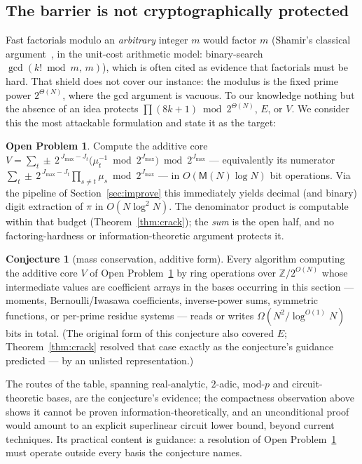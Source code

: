 \documentclass[11pt]{article}
\theoremstyle{remark}
\theoremstyle{definition}
\newtheorem{openproblem}[theorem]{Open Problem}
\newtheorem{conjecture}[theorem]{Conjecture}
\newcommand{\M}{\mathsf{M}}
\newcommand{\Z}{\mathbb{Z}}
\begin{document}
\subsection{The barrier is not cryptographically protected}

Fast factorials modulo an \emph{arbitrary} integer $m$ would factor $m$
(Shamir's classical argument~\cite{Shamir79}, in the unit-cost arithmetic model: binary-search
$\gcd(k!\bmod m,\,m)$), which is often cited as evidence that factorials
must be hard. That shield does not cover our instance: the modulus is the
fixed prime power $2^{\Theta(N)}$, where the gcd argument is vacuous. To
our knowledge nothing but the absence of an idea protects
$\prod(8k+1)\bmod 2^{\Theta(N)}$, $E$, or $V$. We consider this the most
attackable formulation and state it as the target:

\begin{openproblem}\label{op:E}
Compute the additive core
$V=\sum_t \pm\,2^{\,J_{\max}-J_t}\bigl(\mu_t^{-1}\bmod 2^{J_{\max}}\bigr)
\bmod 2^{J_{\max}}$ --- equivalently its numerator
$\sum_t \pm\,2^{\,J_{\max}-J_t}\prod_{s\ne t}\mu_s \bmod 2^{J_{\max}}$
--- in $O(\M(N)\log N)$ bit operations. Via the pipeline of
Section~\ref{sec:improve} this immediately yields decimal (and binary)
digit extraction of $\pi$ in $O(N\log^{2}N)$. The denominator product is
computable within that budget (Theorem~\ref{thm:crack}); the \emph{sum}
is the open half, and no factoring-hardness or information-theoretic
argument protects it.
\end{openproblem}

\begin{conjecture}[mass conservation, additive form]\label{conj:mass}
Every algorithm computing the additive core $V$ of
Open Problem~\ref{op:E} by ring operations over $\Z/2^{O(N)}$ whose
intermediate values are coefficient arrays in the bases occurring in
this section --- moments, Bernoulli/Iwasawa coefficients, inverse-power
sums, symmetric functions, or per-prime residue systems --- reads or
writes $\Omega(N^{2}/\log^{O(1)}N)$ bits in total. (The original form of
this conjecture also covered $E$; Theorem~\ref{thm:crack} resolved that
case exactly as the conjecture's guidance predicted --- by an
unlisted representation.)
\end{conjecture}

The routes of the table, spanning real-analytic, $2$-adic, mod-$p$ and
circuit-theoretic bases, are the conjecture's evidence; the compactness
observation above shows it cannot be proven information-theoretically,
and an unconditional proof would amount to an explicit superlinear
circuit lower bound, beyond current techniques. Its practical content is
guidance: a resolution of Open Problem~\ref{op:E} must operate outside
every basis the conjecture names.
\end{document}
